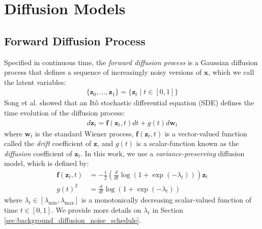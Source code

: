 \documentclass[ oneside,%
                    author={George Herbert},
                    degree={MSci},
                     title={Video Diffusion Models for Climate Simulations},
                  subtitle={}]{dissertation}
\begin{document}
\section{Diffusion Models}
\label{sec:background_diffusion}

\subsection{Forward Diffusion Process}
\label{sec:background_diffusion_forward}

Specified in continuous time, the \textit{forward diffusion process} is a Gaussian diffusion process that defines a sequence of increasingly noisy versions of $\mathbf{x}$, which we call the latent variables:
\begin{align}
      \{\mathbf{z}_0,\ldots,\mathbf{z}_1\}=\{\mathbf{z}_t\mid t\in[0,1]\}
\end{align}
Song et al. \cite{Score_Based_Song} showed that an It\^{o} stochastic differential equation (SDE) defines the time evolution of the diffusion process:
\begin{align}
      d\mathbf{z}_t=\mathbf{f}(\mathbf{z}_t,t)dt + g(t)d\mathbf{w}_t\label{eq:forward_sde}
\end{align}
where $\mathbf{w}_t$ is the standard Wiener process, $\mathbf{f}(\mathbf{z}_t, t)$ is a vector-valued function called the \textit{drift} coefficient of $\mathbf{z}$, and $g(t)$ is a scalar-function known as the \textit{diffusion} coefficient of $\mathbf{z}_t$. In this work, we use a \textit{variance-preserving} diffusion model, which is defined by:
\begin{align}
      \mathbf{f}(\mathbf{z}_t,t)&=-\frac{1}{2}\left(\frac{d}{dt}\log\left(1+\exp(-\lambda_t)\right)\right)\mathbf{z}_t\\
      g(t)^2&=\frac{d}{dt}\log\left(1+\exp(-\lambda_t)\right)\label{eq:diffusion_coefficient_scalar}
\end{align}
where $\lambda_t\in[\lambda_{\min}, \lambda_{\max}]$ is a monotonically decreasing scalar-valued function of time $t\in[0,1]$. We provide more details on $\lambda_t$ in Section \ref{sec:background_diffusion_noise_schedule}. 
\end{document}
